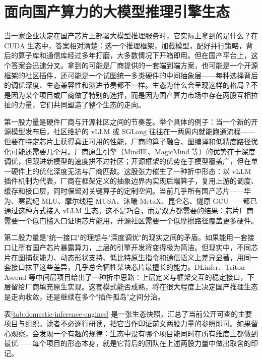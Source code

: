 \section{面向国产算力的大模型推理引擎生态}
\label{sec:domestic-ecosystem}

当一家企业决定在国产芯片上部署大模型推理服务时，它实际上拿到的是什么？在 CUDA 生态中，答案相对清楚：选一个推理框架，加载模型，配好并行策略，背后的算子库和通信库经过多年打磨，大多数情况下开箱即用。但在国产平台上，这个答案会迅速分叉。拿到的可能是厂商提供的一套端到端方案，也可能是一个开源框架的社区插件，还可能是一个试图统一多类硬件的中间抽象层——每种选择背后的调优深度、生态兼容性和演进节奏都不一样。生态为什么会呈现这样的格局？不是因为某个项目或厂商做了特别的选择，而是因为国产算力市场中存在两股互相拉扯的力量，它们共同塑造了整个生态的走向。

第一股力量是硬件厂商与开源社区之间的节奏差。举个具体的例子：当一个新的开源模型发布后，社区维护的 vLLM 或 SGLang 往往在一两周内就能跑通流程——但要在特定芯片上获得真正可用的性能，厂商的算子融合、图编译和低精度路径优化可能还需要几个月。厂商原生引擎（MindIE、MagicMind 等）的优势在于深度调优，但跟进新模型的速度拼不过社区；开源框架的优势在于模型覆盖广，但在单一硬件上的优化深度无法与厂商匹敌。这股张力催生了一种折中形态：以 vLLM 插件机制为代表，厂商在框架定义的抽象边界内实现后端算子，复用上游的调度、缓存和接口层，同时保留对关键算子的定制空间。当前几乎所有国产芯片——华为、寒武纪 MLU、摩尔线程 MUSA、沐曦 MetaX、昆仑芯、燧原 GCU——都已通过这种方式接入 vLLM 生态。这不是巧合，而是双方都需要的结果：芯片厂商需要一个低门槛入口证明芯片能用，开源社区需要一个低摩擦路径覆盖更多硬件。

第二股力量是"统一接口"的理想与"深度调优"的现实之间的矛盾。如果能用一套接口让所有国产芯片暴露算力，上层的引擎开发将变得极为简洁。但现实中，不同芯片在图捕获能力、动态形状支持、低比特原生指令和通信语义上差异显著，用同一套接口抹平这些差异，几乎总会牺牲某块芯片最擅长的能力。DLinfer、Triton-Ascend 等中间层项目给出了一种折中思路：上层定义与框架交互的稳定接口，下层留给厂商填充原生实现。这套模式能否成熟，将在很大程度上决定国产推理生态是走向收敛，还是继续在多个"插件孤岛"之间分治。

表\ref{tab:domestic-inference-engines} 是一张生态快照，汇总了当前公开可查的主要项目与组织。读者不必逐行研读，把它当作印证前文两股力量的参照即可。如果留心观察，会发现一个有趣的规律：生态中没有哪个项目能同时在所有维度上都做到最优——每个项目的形态本身，就是它背后的团队在上述两股力量中做出取舍的印记。


